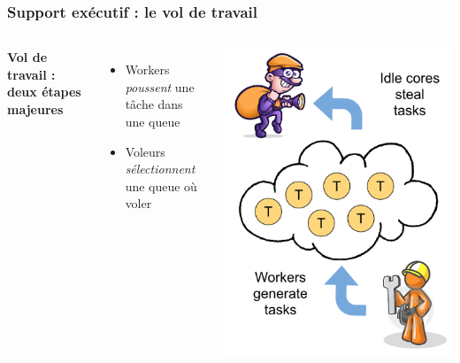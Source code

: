 \documentclass[xcolor={usenames,dvipsnames,svgnames,table}, aspectratio=43]{beamer}
\begin{document}
\begin{frame}[fragile]
\frametitle{Support exécutif : le vol de travail}

\begin{columns}[T,onlytextwidth]
  \vspace{1cm}

  \textbf{Vol de travail : deux étapes majeures}
  \begin{itemize}
    \item Workers \textit{poussent} une tâche dans une queue
    \item Voleurs \textit{sélectionnent} une queue où voler
  \end{itemize}
  \includegraphics[scale=0.38]{graph/ws}
\end{columns}

\end{frame}
\end{document}
